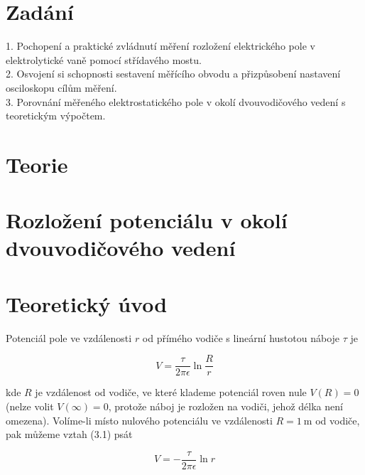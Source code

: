 \documentclass[czech,11pt,a4paper]{article}
\begin{document}
	\begin{multicols}{2}
		

	\section{Zadání}
	1. Pochopení a praktické zvládnutí měření rozložení elektrického pole v elektrolytické vaně pomocí střídavého mostu.\\
	2. Osvojení si schopnosti sestavení měřícího obvodu a přizpůsobení nastavení osciloskopu cílům měření.\\
	3. Porovnání měřeného elektrostatického pole v okolí dvouvodičového vedení s teoretickým výpočtem.\\
	
	
	\section{Teorie}
	\section*{Rozložení potenciálu v okolí dvouvodičového vedení}
	\section*{Teoretický úvod}
	Potenciál pole ve vzdálenosti $r$ od přímého vodiče s lineární hustotou náboje $\tau$ je
	
	
	\begin{equation*}
		V=\frac{\tau}{2 \pi \epsilon} \ln \frac{R}{r} \tag{3.1}
	\end{equation*}
	
	
	kde $R$ je vzdálenost od vodiče, ve které klademe potenciál roven nule $V(R)=0$ (nelze volit $V(\infty)=0$, protože náboj je rozložen na vodiči, jehož délka není omezena). Volíme-li místo nulového potenciálu ve vzdálenosti $R=1 \mathrm{~m}$ od vodiče, pak můžeme vztah (3.1) psát
	
	
	\begin{equation*}
		V=-\frac{\tau}{2 \pi \epsilon} \ln r \tag{3.2}
	\end{equation*}
	

\end{multicols}
\end{document}
